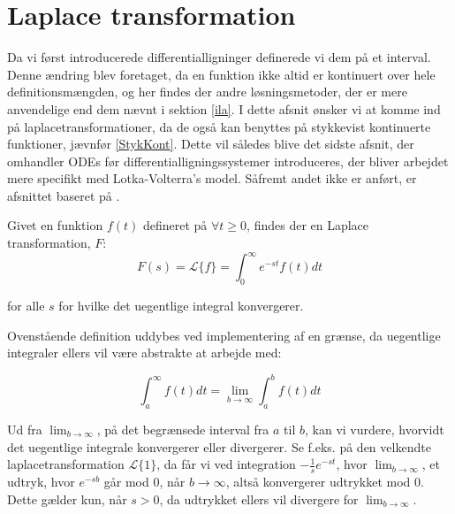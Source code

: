 \section{Laplace transformation}
Da vi først introducerede differentialligninger definerede vi dem på et interval. Denne ændring blev foretaget, da en funktion ikke altid er kontinuert over hele definitionsmængden, og her findes der andre løsningsmetoder, der er mere anvendelige end dem nævnt i sektion \ref{ila}. I dette afsnit ønsker vi at komme ind på laplacetransformationer, da de også kan benyttes på stykkevist kontinuerte funktioner, jævnfør \ref{StykKont}. Dette vil således blive det sidste afsnit, der omhandler ODEs før differentialligningssystemer introduceres, der bliver arbejdet mere specifikt med Lotka-Volterra's model. Såfremt andet ikke er anført, er afsnittet baseret på \citep[]{EP}.

\begin{definition}
Givet en funktion $f(t)$ defineret på $\forall t \geq 0$, findes der en Laplace transformation, $F$:
$$F(s) = \mathcal{L} \{ f\} = \int_{0}^{\infty} e^{-st}f(t)dt $$

for alle $s$ for hvilke det uegentlige integral konvergerer.

\end{definition}

Ovenstående definition uddybes ved implementering af en grænse, da uegentlige integraler ellers vil være abstrakte at arbejde med:

\begin{equation}\label{BToInf}
    \int_a^\infty f(t) dt = \lim_{b\to\infty} \int_a^b f(t) dt
\end{equation}

Ud fra $\lim_{b\to\infty}$, på det begrænsede interval fra $a$ til $b$, kan vi vurdere, hvorvidt det uegentlige integrale konvergerer eller divergerer. Se f.eks. på den velkendte laplacetransformation $\mathcal{L}\{1\}$, da får vi ved integration $-\frac{1}{s}e^{-st}$, hvor $\lim_{b\to\infty}$, et udtryk, hvor $e^{-sb}$ går mod $0$, når $b\to\infty$, altså konvergerer udtrykket mod 0. Dette gælder kun, når $s > 0$, da udtrykket ellers vil divergere for $\lim_{b\to\infty}$.
\hfill \break


